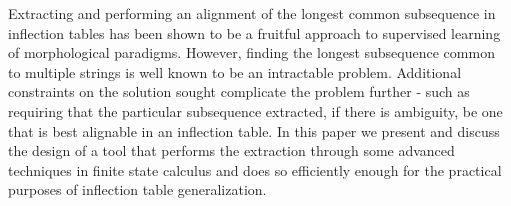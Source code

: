 Extracting and performing an alignment of the longest common subsequence in inflection tables has been shown to be a fruitful approach to supervised learning of morphological paradigms.  However, finding the longest subsequence common to multiple strings is well known to be an intractable problem. Additional constraints on the solution sought complicate the problem further - such as requiring that the particular subsequence extracted, if there is ambiguity, be one that is best alignable in an inflection table.  In this paper we present and discuss the design of a tool that performs the extraction through some advanced techniques in finite state calculus and does so efficiently enough for the practical purposes of inflection table generalization.
